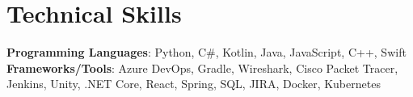 \section{Technical Skills}
 \begin{itemize}[leftmargin=0.15in, label={}]
    \small{\item{
      \textbf{Programming Languages}{: Python, C\#, Kotlin, Java, JavaScript, C++, Swift } \\
     \textbf{Frameworks/Tools}{: Azure DevOps, Gradle, Wireshark, Cisco Packet Tracer, Jenkins, Unity, .NET Core, React, Spring, SQL, JIRA, Docker, Kubernetes }\\
    }}
 \end{itemize}